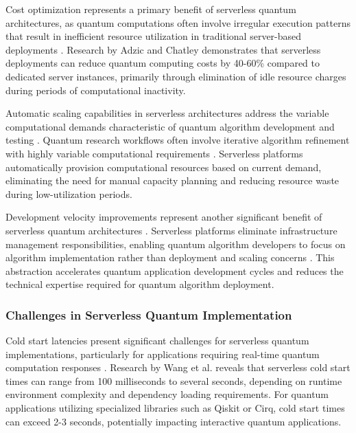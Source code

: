\documentclass[onecolumn]{IEEEtran}
\begin{document}
Cost optimization represents a primary benefit of serverless quantum architectures, as quantum computations often involve irregular execution patterns that result in inefficient resource utilization in traditional server-based deployments \cite{eismann2020review}. Research by Adzic and Chatley \cite{adzic2017serverless} demonstrates that serverless deployments can reduce quantum computing costs by 40-60\% compared to dedicated server instances, primarily through elimination of idle resource charges during periods of computational inactivity.

Automatic scaling capabilities in serverless architectures address the variable computational demands characteristic of quantum algorithm development and testing \cite{baldini2017serverless}. Quantum research workflows often involve iterative algorithm refinement with highly variable computational requirements \cite{cerezo2021}. Serverless platforms automatically provision computational resources based on current demand, eliminating the need for manual capacity planning and reducing resource waste during low-utilization periods.

Development velocity improvements represent another significant benefit of serverless quantum architectures \cite{hellerstein2018serverless}. Serverless platforms eliminate infrastructure management responsibilities, enabling quantum algorithm developers to focus on algorithm implementation rather than deployment and scaling concerns \cite{jonas2019cloud}. This abstraction accelerates quantum application development cycles and reduces the technical expertise required for quantum algorithm deployment.

\subsubsection{Challenges in Serverless Quantum Implementation}

Cold start latencies present significant challenges for serverless quantum implementations, particularly for applications requiring real-time quantum computation responses \cite{manner2018cold}. Research by Wang et al. \cite{wang2018peeking} reveals that serverless cold start times can range from 100 milliseconds to several seconds, depending on runtime environment complexity and dependency loading requirements. For quantum applications utilizing specialized libraries such as Qiskit or Cirq, cold start times can exceed 2-3 seconds, potentially impacting interactive quantum applications.
\end{document}
